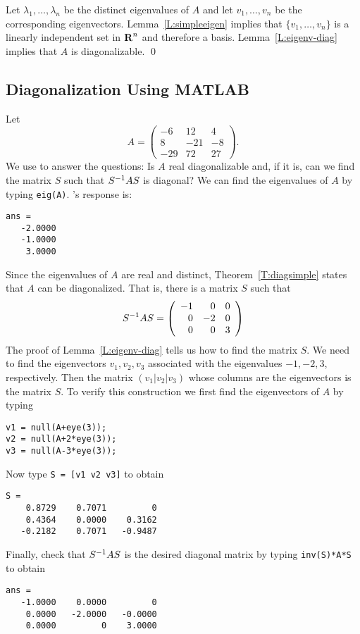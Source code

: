  Let
$\lambda_1,\ldots,\lambda_n$ be the distinct eigenvalues of 
$A$ and let $v_1,\ldots,v_n$ be the corresponding eigenvectors.
Lemma~\ref{L:simpleeigen} implies that $\{v_1,\ldots,v_n\}$ is 
a linearly independent set in $\mbox{$\bf{R}$}^n$ and therefore a basis.
Lemma~\ref{L:eigenv-diag} implies that $A$ is diagonalizable.  \qed

\subsection*{Diagonalization Using MATLAB}

Let
\begin{equation*}
A= \left( \begin{array}{rrr} -6 & 12 & 4 \\
 8 & -21 & -8 \\
  -29 & 72 & 27 \end{array} \right).
\end{equation*}
We use \Matlab to answer the questions:  Is $A$ real diagonalizable 
and, if it is, can we find the matrix $S$ such that $S^{-1} AS$ is diagonal?
We can find the eigenvalues of $A$ by typing {\tt eig(A)}. \Matlabp's
response is:
\begin{verbatim}
ans =
   -2.0000
   -1.0000
    3.0000
\end{verbatim}
Since the eigenvalues of $A$ are real and distinct, 
Theorem~\ref{T:diagsimple} states that $A$ can be diagonalized.  
That is, there is a matrix $S$ such that 
\[
S^{-1} AS = \left(\begin{array}{rrr} -1 & 0 & 0 \\ 0 & -2 & 0\\
0 & 0 & 3 \end{array}\right)
\]
The proof of Lemma~\ref{L:eigenv-diag} tells us how to find the 
matrix $S$.  We need to find the eigenvectors $v_1,v_2,v_3$ 
associated with the eigenvalues $-1,-2,3$, respectively.  Then 
the matrix $(v_1|v_2|v_3)$ whose columns are the eigenvectors is 
the matrix $S$. To verify this construction we first find the 
eigenvectors of $A$ by typing
\begin{verbatim}
v1 = null(A+eye(3));
v2 = null(A+2*eye(3));
v3 = null(A-3*eye(3));
\end{verbatim} 
Now type {\tt S = [v1 v2 v3]} to obtain
\begin{verbatim}
S =
    0.8729    0.7071         0
    0.4364    0.0000    0.3162
   -0.2182    0.7071   -0.9487
\end{verbatim}
Finally, check that $S^{-1} AS$ is the desired diagonal matrix by 
typing {\tt inv(S)*A*S} to obtain
\begin{verbatim}
ans =
   -1.0000    0.0000         0
    0.0000   -2.0000   -0.0000
    0.0000         0    3.0000
\end{verbatim}

